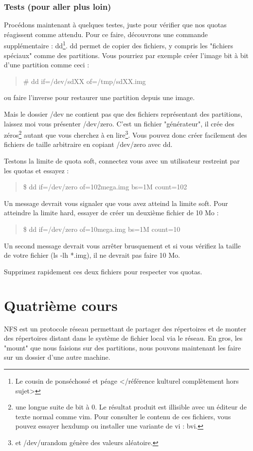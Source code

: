\documentclass[a4paper]{article}
\newcommand{\commande}[1] {
    \begin{quote}
    \tt\raggedright #1 
    \end{quote}
}
\begin{document}
\subsubsection{Tests (pour aller plus loin)}
\par Procédons maintenant à quelques testes, juste pour vérifier que nos quotas réagissent comme attendu. Pour ce faire, découvrons une commande supplémentaire : dd\footnote{Le cousin de ponséchossé et péage </référence kulturel complètement hors sujet>}. dd permet de copier des fichiers, y compris les "fichiers spéciaux" comme des partitions. Vous pourriez par exemple créer l'image bit à bit d'une partition comme ceci :
\commande{\# dd if=/dev/sdXX of=/tmp/sdXX.img}
ou faire l'inverse pour restaurer une partition depuis une image.
\par Mais le dossier /dev ne contient pas que des fichiers représentant des partitions, laissez moi vous présenter /dev/zero. C'est un fichier "générateur", il crée des zéros\footnote{une longue suite de bit à 0. Le résultat produit est illisible avec un éditeur de texte normal comme vim. Pour consulter le contenu de ces fichiers, vous pouvez essayer hexdump ou installer une variante de vi : bvi.} autant que vous cherchez à en lire\footnote{et /dev/urandom génère des valeurs aléatoire.}. Vous pouvez donc créer facilement des fichiers de taille arbitraire en copiant /dev/zero avec dd.
\par Testons la limite de quota soft, connectez vous avec un utilisateur restreint par les quotas et essayez :
\commande{\$ dd if=/dev/zero of=102mega.img bs=1M count=102}
Un message devrait vous signaler que vous avez atteind la limite soft. Pour atteindre la limite hard, essayer de créer un deuxième fichier de 10 Mo :
\commande{\$ dd if=/dev/zero of=10mega.img bs=1M count=10}
Un second message devrait vous arrêter brusquement et si vous vérifiez la taille de votre fichier (ls -lh *.img), il ne devrait pas faire 10 Mo.
\par Supprimez rapidement ces deux fichiers pour respecter vos quotas.

\section{Quatrième cours}
\par NFS est un protocole réseau permettant de partager des répertoires et de monter des répertoires distant dans le système de fichier local via le réseau. En gros, les "mount" que nous faisions sur des partitions, nous pouvons maintenant les faire sur un dossier d'une autre machine.
\end{document}
